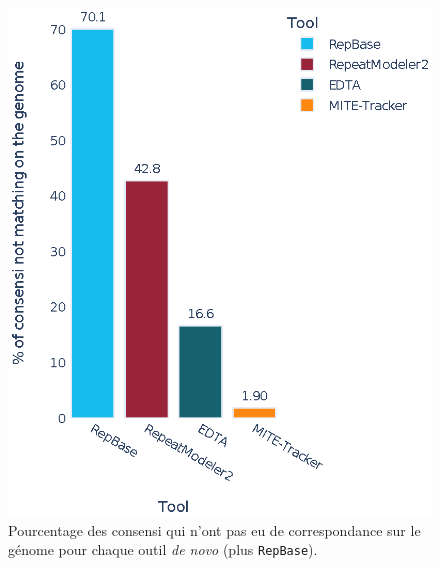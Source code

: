 \documentclass[10pt]{article}
\begin{document}
\bigskip

\begin{figure}[h]
    \centering
    \includegraphics[width=\textwidth]{img/plots/nb_cons_by_tool.eps}
    \caption{Pourcentage des consensi qui n'ont pas eu de correspondance sur le génome pour chaque outil \textit{de novo} (plus \texttt{RepBase}).}
    \label{fig:nb_cons_by_tool}
\end{figure}

\bigskip
\end{document}
